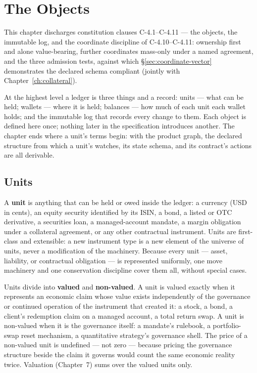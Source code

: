 \documentclass[11pt,a4paper]{article}
\begin{document}
\section{The Objects}\label{ch:objects}

This chapter discharges constitution clauses C-4.1--C-4.11 --- the objects, the immutable log, and the coordinate discipline of C-4.10--C-4.11: ownership first and alone value-bearing, further coordinates mass-only under a named agreement, and the three admission tests, against which \S\ref{sec:coordinate-vector} demonstrates the declared schema compliant (jointly with Chapter~\ref{ch:collateral}).

At the highest level a ledger is three things and a record: units --- what can be held;
wallets --- where it is held; balances --- how much of each unit each wallet holds; and
the immutable log that records every change to them. Each object is defined here once;
nothing later in the specification introduces another. The chapter ends where a unit's
terms begin: with the product graph, the declared structure from which a unit's watches,
its state schema, and its contract's actions are all derivable.

\subsection{Units}

A \textbf{unit} is anything that can be held or owed inside the ledger: a currency (USD
in cents), an equity security identified by its ISIN, a bond, a listed or OTC derivative,
a securities loan, a managed-account mandate, a margin obligation under a collateral
agreement, or any other contractual instrument. Units are first-class and extensible: a
new instrument type is a new element of the universe of units, never a modification of
the machinery. Because every unit --- asset, liability, or contractual obligation --- is
represented uniformly, one move machinery and one conservation discipline cover them all,
without special cases.

Units divide into \textbf{valued} and \textbf{non-valued}. A unit is valued exactly when
it represents an economic claim whose value exists independently of the governance or
continued operation of the instrument that created it: a stock, a bond, a client's
redemption claim on a managed account, a total return swap. A unit is non-valued when it
is the governance itself: a mandate's rulebook, a portfolio-swap reset mechanism, a
quantitative strategy's governance shell. The price of a non-valued unit is undefined ---
not zero --- because pricing the governance structure beside the claim it governs would
count the same economic reality twice. Valuation (Chapter~7) sums over the valued units
only.
\end{document}
